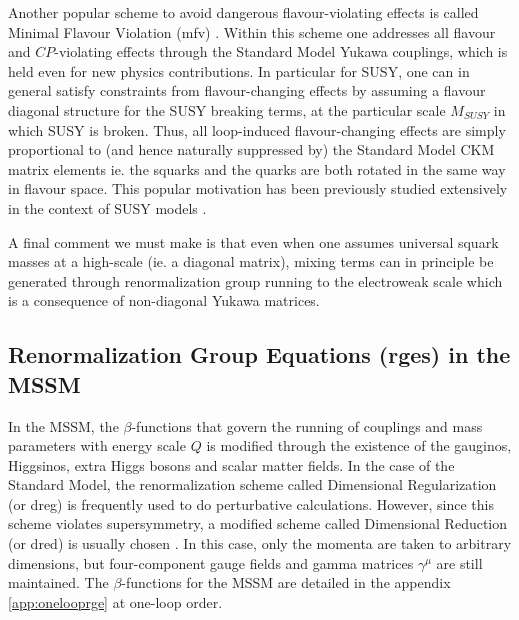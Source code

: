 Another popular scheme to avoid dangerous flavour-violating effects is called Minimal Flavour Violation (\acrshort{mfv}) \cite{RN556,RN582,RN583,RN581,RN580}. Within this scheme one addresses all flavour and $CP$-violating effects through the Standard Model Yukawa couplings, which is held even for new physics contributions. In particular for SUSY, one can in general satisfy constraints from flavour-changing effects by assuming a flavour diagonal structure for the SUSY breaking terms, at the particular scale $M_{SUSY}$ in which SUSY is broken. Thus, all loop-induced flavour-changing effects are simply proportional to (and hence naturally suppressed by) the Standard Model CKM matrix elements ie. the squarks and the quarks are both rotated in the same way in flavour space. This popular motivation has been previously studied extensively in the context of SUSY models \cite{RN584,RN585,RN586,RN587,RN588,RN589,RN590,RN591,RN592,RN593,RN594,RN595,RN596}.

A final comment we must make is that even when one assumes universal squark masses at a high-scale (ie. a diagonal matrix), mixing terms can in principle be generated through renormalization group running to the electroweak scale which is a consequence of non-diagonal Yukawa matrices.

\subsection{Renormalization Group Equations (\acrshort{rge}s) in the MSSM}
\label{subsec:MSSMRGEs}

In the MSSM, the $\beta$-functions that govern the running of couplings and mass parameters with energy scale $Q$ is modified through the existence of the gauginos, Higgsinos, extra Higgs bosons and scalar matter fields. In the case of the Standard Model, the renormalization scheme called Dimensional Regularization (or \acrshort{dreg}) is frequently used to do perturbative calculations. However, since this scheme violates supersymmetry, a modified scheme called Dimensional Reduction (or \acrshort{dred}) is usually chosen \cite{RN692}. In this case, only the momenta are taken to arbitrary dimensions, but four-component gauge fields and gamma matrices $\gamma^{\mu}$ are still maintained. The $\beta$-functions for the MSSM are detailed in the appendix \ref{app:onelooprge} at one-loop order.

